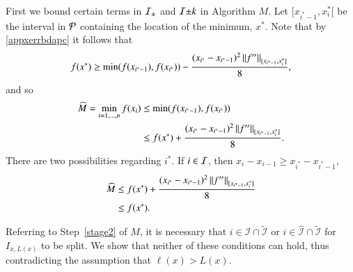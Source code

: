 \documentclass[review]{elsarticle}
\theoremstyle{definition}
\newcommand{\hM}{\widehat{M}}
\begin{document}
First we bound certain terms in $\ci_{\pm}$ and $\ci{\pm k}$ in Algorithm $M$.  Let $[x_{i^*-1}, x^*_i[$ be the interval in $\cp$ containing the location of the minimum, $x^*$.  Note that by \eqref{appxerrbdapc} it follows that
\[
f(x^*) \ge \min(f(x_{i^*-1}),f(x_{i^*})) - \frac{(x_{i^*} - x_{i^*-1})^2\norm[{[x_{i^*-1}, x^*_i]}]{f''}}{8},
\]
and so
\begin{align*}
\hM  = \min_{i=1, \ldots, n} f(x_i) & \le \min(f(x_{i^*-1}),f(x_{i^*})) \\
& \le f(x^*) + \frac{(x_{i^*} - x_{i^*-1})^2\norm[{[x_{i^*-1}, x^*_i]}]{f''}}{8}.
\end{align*}
There are two possibilities regarding $i^*$.  If $i \in \ci$, then $x_i -  x_{i-1} \ge x_{i^*} -  x_{i^*-1}$,
\begin{align*}
\hM  & \le f(x^*) + \frac{(x_{i^*} - x_{i^*-1})^2\norm[{[x_{i^*-1}, x^*_i]}]{f''}}{8} \\
& \le  f(x^*) .
\end{align*}








Referring to Step~\ref{stage2} of $M$, it is necessary that $i \in \mathcal{I} \cap \widetilde{\mathcal{I}}$ or  $i \in \widehat{\mathcal{I}}\cap \widetilde{\mathcal{I}}$ for $I_{x,L(x)}$ to be split.  We show that neither of these conditions can hold, thus contradicting the assumption that $\ell(x) > L(x)$.
\end{document}
